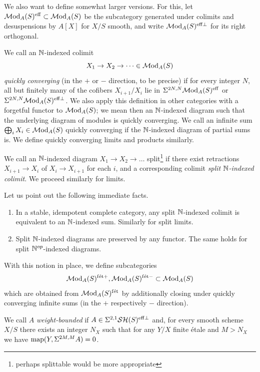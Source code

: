 \documentclass{amsart}
\renewcommand{\NB}[1]{}
\numberwithin{proposition}{section}
\numberwithin{equation}{section}
\def\fet{\mathrm{f\acute et}}
\begin{document}
We also want to define somewhat larger versions.
For this, let $\mathcal{M}\mathrm{od}_A(S)^{\mathrm{eff}} \subset \mathcal{M}\mathrm{od}_A(S)$ be the subcategory generated under colimits and desuspensions by $A[X]$ for $X/S$ smooth, and write $\mathcal{M}\mathrm{od}_A(S)^{{\mathrm{eff}}\perp}$ for its right orthogonal.
\begin{definition} \label{def:quick-conv}
We call an $\mathbb{N}$-indexed colimit \[ X_1 \to X_2 \to \dots \in \mathcal{M}\mathrm{od}_A(S) \] \emph{quickly converging} (in the $+$ or $-$ direction, to be precise) if for every integer $N$, all but finitely many of the cofibers $X_{i+1}/X_i$ lie in $\Sigma^{2N,N} \mathcal{M}\mathrm{od}_A(S)^{\mathrm{eff}}$ or $\Sigma^{2N,N} \mathcal{M}\mathrm{od}_A(S)^{{\mathrm{eff}}\perp}$.
We also apply this definition in other categories with a forgetful functor to $\mathcal{M}\mathrm{od}_A(S)$; we mean then an $\mathbb{N}$-indexed diagram such that the underlying diagram of modules is quickly converging.
We call an infinite sum $\bigoplus_i X_i \in \mathcal{M}\mathrm{od}_A(S)$ quickly converging if the $\mathbb{N}$-indexed diagram of partial sums is.
We define quickly converging limits and products similarly.
\end{definition}

\begin{definition}
We call an $\mathbb{N}$-indexed diagram $X_1 \to X_2 \to \dots$ split\footnote{perhaps splittable would be more appropriate} if there exist retractions $X_{i+1} \to X_i$ of $X_i \to X_{i+1}$ for each $i$, and a corresponding colimit \emph{split $\mathbb{N}$-indexed colimit}.
We proceed similarly for limits.
\end{definition}
\begin{remark} \label{rmk:split-immediate}
Let us point out the following immediate facts.
\begin{enumerate}
\item In a stable, idempotent complete category, any split $\mathbb{N}$-indexed colimit is equivalent to an $\mathbb{N}$-indexed sum.
  Similarly for split limits.
\item Split $\mathbb{N}$-indexed diagrams are preserved by any functor.
  The same holds for split $\mathbb{N}^{op}$-indexed diagrams.
\end{enumerate}
\end{remark}

With this notion in place, we define subcategories \[ \Mod_A(S)^{\fet+}, \Mod_A(S)^{\fet-} \subset \Mod_A(S) \] which are obtained from $\Mod_A(S)^{\fet}$ by additionally closing under quickly converging infinite sums (in the $+$ respectively $-$ direction).

\begin{definition} \label{def:wt-bounded}
We call $A$ \emph{weight-bounded}\NB{``and coeffective''?} if $A \in \Sigma^{2,1}\mathcal{SH}(S)^{{\mathrm{eff}}\perp}$ and, for every smooth scheme $X/S$ there exists an integer $N_X$ such that for any $Y/X$ finite étale and $M > N_X$ we have $\mathrm{map}(Y, \Sigma^{2M,M}A) = 0$.\NB{not minimal assumptions}
\end{definition}
\end{document}
